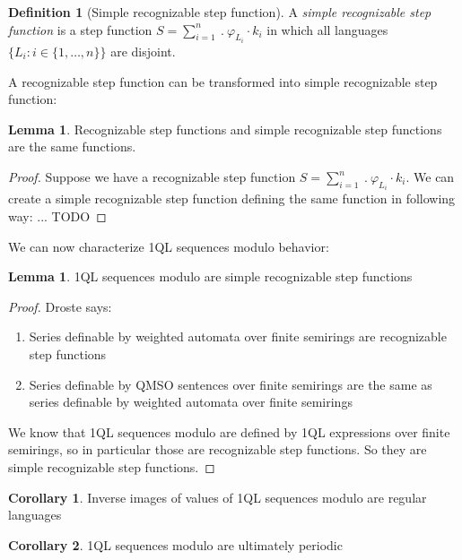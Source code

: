 \documentclass[12pt]{article}
\theoremstyle{definition}
\newtheorem{definition}{Definition}[section]
\newtheorem{corollary}{Corollary}[section]
\newtheorem{lemma}[theorem]{Lemma}
\begin{document}
\begin{definition}[Simple recognizable step function]
    A \textit{simple recognizable step function} is a step function $S = \sum_{i = 1}^{n} \ . \ \varphi_{L_i} \cdot k_i$ in which all languages $\{L_i : i \in \{1,\ldots,n\}\}$ are disjoint.
\end{definition}

A recognizable step function can be transformed into simple recognizable step function:

\begin{lemma}
    Recognizable step functions and simple recognizable step functions are the same functions.
\end{lemma}

\begin{proof}
    Suppose we have a recognizable step function $S = \sum_{i = 1}^{n} \ . \ \varphi_{L_i} \cdot k_i$. We can create a simple recognizable step function defining the same function in following way: ... TODO
\end{proof}

We can now characterize 1QL sequences modulo behavior:

\begin{lemma}
    1QL sequences modulo are simple recognizable step functions
\end{lemma}

\begin{proof}
    Droste says:
    \begin{enumerate}
        \item Series definable by weighted automata over finite semirings are recognizable step functions
        \item Series definable by QMSO sentences over finite semirings are the same as series definable by weighted automata over finite semirings
    \end{enumerate}
    We know that 1QL sequences modulo are defined by 1QL expressions over finite semirings, so in particular those are recognizable step functions. So they are simple recognizable step functions.
\end{proof}

\begin{corollary}
    Inverse images of values of 1QL sequences modulo are regular languages
\end{corollary}

\begin{corollary}
    1QL sequences modulo are ultimately periodic
\end{corollary}
\end{document}
